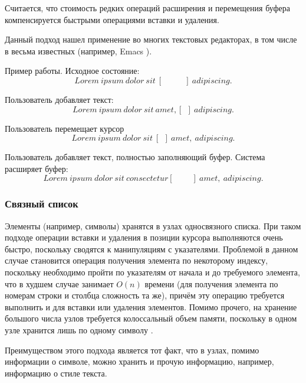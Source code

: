 \documentclass{fefu}
\begin{document}
				Считается, что стоимость редких операций расширения и перемещения буфера
				компенсируется быстрыми операциями вставки и удаления.
				\par Данный подход нашел применение во многих текстовых
				редакторах, в том числе в весьма известных (например, Emacs
				\cite{EmacsGapBuffer}).
				\par Пример работы. Исходное состояние:
				$$Lorem~ipsum~dolor~sit~[~~~~~~~~~~~~]~adipiscing.$$
				\par Пользователь добавляет текст:
				$$Lorem~ipsum~dolor~sit~amet,[~~]~adipiscing.$$
				\par Пользователь перемещает курсор
				$$Lorem~ipsum~dolor~sit~[~~]~amet,~adipiscing.$$
				\par Пользователь добавляет текст, полностью заполняющий буфер. Система
				расширяет буфер:
				$$Lorem~ipsum~dolor~sit~consectetur[~~~~~~~~~~]~amet,~adipiscing.$$
			\subsubsection{Связный список}
				\par Элементы (например, символы) хранятся в узлах односвязного списка. При 
				таком подходе операции вставки и удаления в позиции курсора выполняются очень 
				быстро, поскольку сводятся к манипуляциям с указателями. Проблемой в данном 
				случае становится операция получения элемента по некоторому индексу, поскольку 
				необходимо пройти по указателям от начала и до требуемого элемента, что в 
				худшем случае занимает $O(n)$ времени (для получения элемента по номерам строки
				и столбца сложность та же), причём эту операцию требуется выполнить и для 
				вставки или удаления элементов. Помимо прочего, на хранение большого числа 
				узлов требуется колоссальный объем памяти, поскольку в одном узле хранится лишь 
				по одному символу \cite{LinkedListReference}.
				\par Преимуществом этого подхода является тот факт, что в узлах, помимо
				информации о символе, можно хранить и прочую информацию, например, информацию
				о стиле текста.
\end{document}
